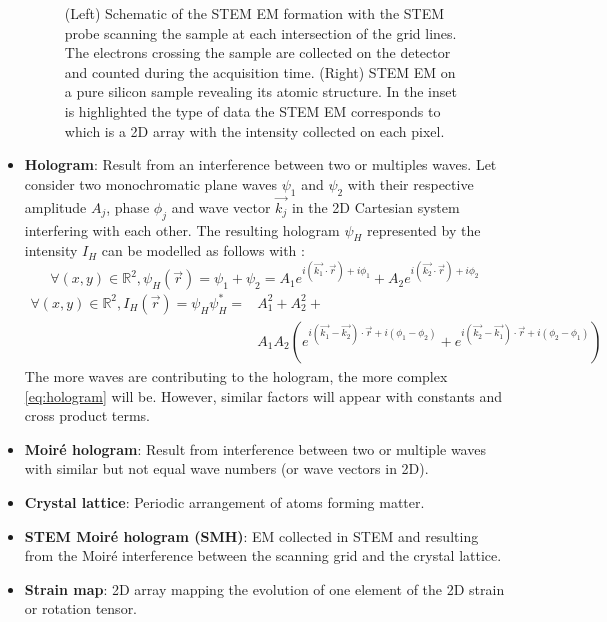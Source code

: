 \documentclass[12pt]{article}
\begin{document}
\begin{itemize}
\begin{figure}[H]
\begin{center}
\caption{(Left) Schematic of the STEM EM formation with the STEM probe scanning the sample at each intersection of the grid lines. The electrons crossing the sample are collected on the detector and counted during the acquisition time. (Right) STEM EM on a pure silicon sample revealing its atomic structure. In the inset is highlighted the type of data the STEM EM corresponds to which is a 2D array with the intensity collected on each pixel.}
\label{fig:STEM_imaging_Fig}
\end{center}
\end{figure}
\item \textbf{Hologram}: Result from an interference between two or multiples waves. \newline
Let consider two monochromatic plane waves $\psi_1$ and $\psi_2$ with their respective amplitude $A_j$, phase $\phi_j$ and wave vector $\vec{k_j}$ in the 2D Cartesian system interfering with each other. The resulting hologram $\psi_H$ represented by the intensity $I_H$ can be modelled as follows with :
\begin{equation}
\forall (x,y) \in \mathbb{R}^{2}, \psi_H(\vec{r})=\psi_1+\psi_2= A_1e^{i(\vec{k_1}\cdot\vec{r})+i\phi_1}+A_2e^{i(\vec{k_2}\cdot\vec{r})+i\phi_2}
\end{equation}
\begin{equation}
\begin{split}
\forall (x,y) \in \mathbb{R}^{2}, I_H(\vec{r})=\psi_H\psi_H^{*}= & A_{1}^{2}+A_{2}^{2}+ \\ & A_{1}A_{2}(e^{i(\vec{k_1}-\vec{k_2})\cdot\vec{r}+i(\phi_1-\phi_2)}+e^{i(\vec{k_2}-\vec{k_1})\cdot\vec{r}+i(\phi_2-\phi_1)})
\end{split}
\label{eq:hologram}
\end{equation}
The more waves are contributing to the hologram, the more complex \cref{eq:hologram} will be. However, similar factors will appear with constants and cross product terms.
\item \textbf{Moir{\'e} hologram}: Result from interference between two or multiple waves with similar but not equal wave numbers (or wave vectors in 2D).
\item \textbf{Crystal lattice}: Periodic arrangement of atoms forming matter.
\item \textbf{STEM Moir{\'e} hologram (SMH)}: EM collected in STEM and resulting from the 
Moir{\'e} interference between the scanning grid and the crystal lattice. 
\item \textbf{Strain map}: 2D array mapping the evolution of one element of the 2D strain or rotation 
tensor. 
\end{itemize}
\end{document}
